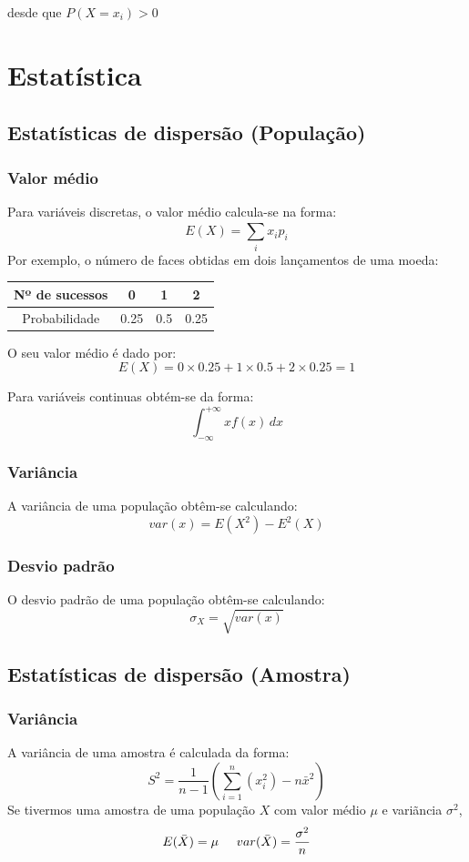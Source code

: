 \documentclass[10pt,a4paper]{report}
\begin{document}
desde que $P(X = x_i) > 0$

\chapter{Estatística}
\section{Estatísticas de dispers\~ao (Populaç\~ao)}
\subsection{Valor médio}
Para variáveis discretas, o valor médio calcula-se na forma:
$$
E(X) = \sum_{i}^{}x_i p_i
$$
Por exemplo, o número de faces obtidas em dois lançamentos de uma moeda:

\begin{table}[h]
\centering
\begin{tabular}{|c|c|c|c|}
\hline
Nº de sucessos & 0    & 1   & 2    \\ \hline
Probabilidade  & 0.25 & 0.5 & 0.25 \\ \hline
\end{tabular}
\end{table}

O seu valor médio é dado por:
$$
E(X) = 0 \times 0.25 + 1 \times 0.5 + 2 \times 0.25 = 1
$$

Para variáveis continuas obtém-se da forma:
$$
\int_{-\infty}^{+\infty} xf(x) \,dx
$$
\subsection{Variância}
A variância de uma população obtêm-se calculando:
$$
var(x) = E(X^2)-E^2(X)
$$
\subsection{Desvio padrão}
O desvio padr\~ao de uma população obtêm-se calculando:
$$
\sigma_X = \sqrt{var(x)}
$$


\section{Estatísticas de dispers\~ao (Amostra)}
\subsection{Variância}
A variância de uma amostra é calculada da forma:
$$S^2= \frac{1}{n-1}\left(\sum_{i=1}^{n}(x_i^2)-n\bar{x}^2\right)$$
Se tivermos uma amostra de uma populaç\~ao $X$ com valor médio $\mu$ e vari\~ancia $\sigma^2$,
$$E(\bar{X}) = \mu\hspace{0.5cm} var(\bar{X}) = \frac{\sigma^2}{n}$$
\end{document}
